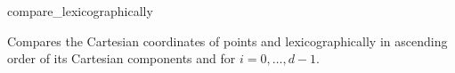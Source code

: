 \begin{ccRefFunction}{compare_lexicographically}

{Compares the Cartesian coordinates of points  and
  lexicographically in ascending order of its Cartesian 
 components  and  for $i = 0,\ldots,d-1$.}
\end{ccRefFunction}

